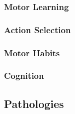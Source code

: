 \subsubsection{Motor Learning} \label{intro:motorLearning}
\subsubsection{Action Selection} \label{intro:actionSelection}
\subsubsection{Motor Habits} \label{intro:motorHabits}
\subsubsection{Cognition} \label{intro:bgCognition}

\subsection{Pathologies}
\label{intro:Motor:pathologies}
